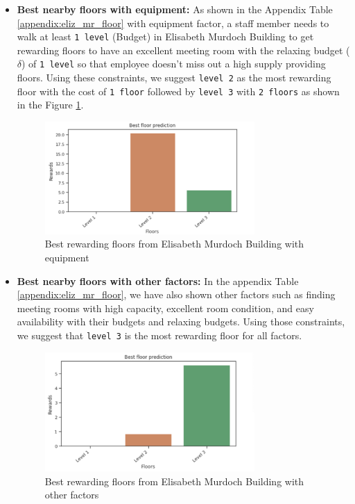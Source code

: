 \begin{itemize}
\item \textbf{Best nearby floors with equipment:} As shown in the Appendix Table \ref{appendix:eliz_mr_floor} with equipment factor, a staff member needs to walk at least \texttt{1 level} (Budget) in Elisabeth Murdoch Building to get rewarding floors to have an excellent meeting room with the relaxing budget ($\delta$) of \texttt{1 level} so that employee doesn't miss out a high supply providing floors. Using these constraints, we suggest \texttt{level 2} as the most rewarding floor with the cost of \texttt{1 floor} followed by \texttt{level 3} with \texttt{2 floors} as shown in the Figure \ref{fig:eliz-floor-equipment}.

\begin{figure}[H]
\centering
  \includegraphics[width=8cm]{content/results/floors/plots/eliz-floor-equipment.png}
\caption{Best rewarding floors from Elisabeth Murdoch Building with equipment}
\label{fig:eliz-floor-equipment}
\end{figure}

\item \textbf{Best nearby floors with other factors:} In the appendix Table \ref{appendix:eliz_mr_floor}, we have also shown other factors such as finding meeting rooms with high capacity, excellent room condition, and easy availability with their budgets and relaxing budgets. Using those constraints, we suggest that \texttt{level 3} is the most rewarding floor for all factors.

\begin{figure}[H]
\centering
  \includegraphics[width=8cm]{content/results/floors/plots/eliz-floor-no-factors.png}
\caption{Best rewarding floors from Elisabeth Murdoch Building with other factors}
\label{fig:eliz-floor-other-factors}
\end{figure}
\end{itemize}


